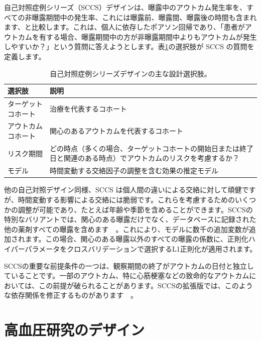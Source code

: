 \documentclass[
  11pt]{book}
\theoremstyle{definition}
\theoremstyle{definition}
\theoremstyle{definition}
\theoremstyle{definition}
\theoremstyle{remark}
\begin{document}
自己対照症例シリーズ（SCCS）デザイン\citep{farrington_1995, whitaker_2006}は、曝露中のアウトカム発生率を、すべての非曝露期間中の発生率、これには曝露前、曝露間、曝露後の時間も含まれます、と比較します。これは、個人に依存したポアソン回帰であり、「患者がアウトカムを有する場合、曝露期間中の方が非曝露期間中よりもアウトカムが発生しやすいか？」という質問に答えようとします。表\ref{tab:sccsChoices}の選択肢が SCCS の質問を定義します。  

\begin{table}
\centering
\caption{\label{tab:sccsChoices}自己対照症例シリーズデザインの主な設計選択肢。}
\centering
\begin{tabular}[t]{l>{\raggedright\arraybackslash}p{9cm}}
\toprule
選択肢 & 説明\\
\midrule
ターゲットコホート & 治療を代表するコホート\\
アウトカムコホート & 関心のあるアウトカムを代表するコホート\\
リスク期間 & どの時点（多くの場合、ターゲットコホートの開始日または終了日と関連のある時点）でアウトカムのリスクを考慮するか？\\
モデル & 時間変動する交絡因子の調整を含む効果の推定モデル\\
\bottomrule
\end{tabular}
\end{table}

他の自己対照デザイン同様、SCCS は個人間の違いによる交絡に対して頑健ですが、時間変動する影響による交絡には脆弱です。これらを考慮するためのいくつかの調整が可能であり、たとえば年齢や季節を含めることができます。SCCSの特別なバリアントでは、関心のある曝露だけでなく、データベースに記録された他の薬剤すべての曝露を含めます　\citep{simpson_2013}。これにより、モデルに数千の追加変数が追加されます。この場合、関心のある曝露以外のすべての曝露の係数に、正則化ハイパーパラメータをクロスバリデーションで選択するL1正則化が適用されます。

SCCSの重要な前提条件の一つは、観察期間の終了がアウトカムの日付と独立していることです。一部のアウトカム、特に心筋梗塞などの致命的なアウトカムにおいては、この前提が破られることがあります。SCCSの拡張版では、このような依存関係を修正するものがあります　\citep{farrington_2011}。

\section{高血圧研究のデザイン}\label{ux9ad8ux8840ux5727ux7814ux7a76ux306eux30c7ux30b6ux30a4ux30f3}
\end{document}
